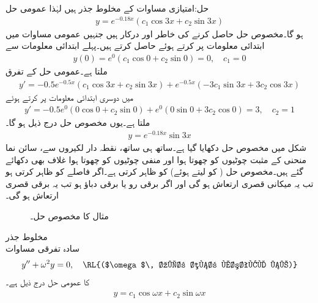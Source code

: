 حل:امتیازی مساوات  کے مخلوط جذر  ہیں لہٰذا عمومی حل
\begin{align*}
y=e^{-0.18x}(c_1 \cos 3x+c_2 \sin 3x)
\end{align*}
ہو گا۔مخصوص حل حاصل کرنے کی خاطر  اور  درکار ہیں جنہیں عمومی مساوات میں ابتدائی معلومات پر کرتے ہوئے حاصل کرتے ہیں۔پہلے ابتدائی معلومات سے
\begin{align*}
y(0)=e^{0}(c_1 \cos 0+c_2 \sin 0)=0, \quad c_1=0
\end{align*}
ملتا ہے۔عمومی حل کے تفرق
\begin{align*}
y'=-0.5e^{-0.5x}(c_1 \cos 3x+c_2 \sin 3x)+e^{-0.5x}(-3c_1 \sin 3x+3c_2 \cos 3x)
\end{align*}
میں دوسری ابتدائی معلومات پر کرتے ہوئے
\begin{align*}
y'=-0.5e^{0}(0 \cos 0+c_2 \sin 0)+e^{0}(0 \sin 0+3c_2 \cos 0)=3, \quad c_2=1
\end{align*}
ملتا ہے۔یوں مخصوص حل درج ذیل ہو گا۔
\begin{align*}
y=e^{-0.18x}\sin 3x
\end{align*}
شکل  میں مخصوص حل دکھایا گیا ہے۔ساتھ ہی ساتھ، نقطہ دار لکیروں سے، سائن نما منحنی کے مثبت چوٹیوں کو چھوتا ہوا   اور منفی چوٹیوں کو چھوتا ہوا غلاف  بھی دکھائے گئے ہیں۔مخصوص حل ( کو  لیتے ہوئے)  کو ظاہر کرتی ہے۔اگر  فاصلے کو ظاہر کرتی ہو تب یہ میکانی قصری ارتعاش ہو گی اور اگر  برقی رو یا برقی دباؤ ہو تب یہ برقی قصری ارتعاش ہو گی۔
\begin{figure}
\centering
{}
\caption{مثال  کا مخصوص حل۔}
\label{شکل_مثال_سادہ_دو_درجی_مخلوط_جذر_الف}
\end{figure}

\quad مخلوط جذر\\
سادہ تفرقی مساوات
\begin{align*}
y''+\omega^2 y=0,\quad \text{\RL{($\omega$\, غیر صفر مستقل ہے)}}
\end{align*}
کا عمومی حل درج ذیل ہے۔
\begin{align*}
y=c_1 \cos \omega x+c_2 \sin \omega x
\end{align*}

